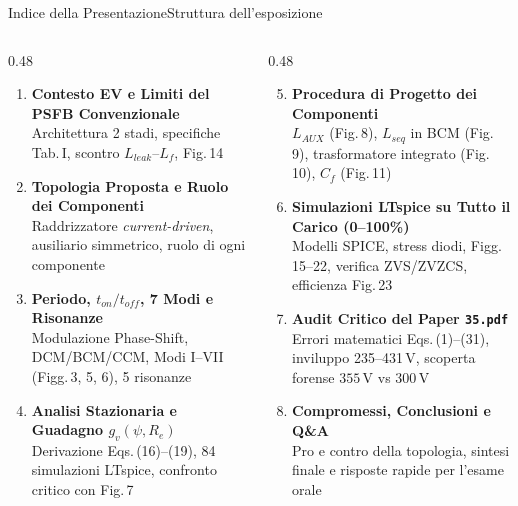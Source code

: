 \documentclass[aspectratio=169,9pt]{beamer}
\newcommand{\V}{\,\text{V}}
\begin{document}
\begin{frame}{Indice della Presentazione}{Struttura dell'esposizione}
  \begin{columns}[T,onlytextwidth]
    \begin{column}{0.48\textwidth}
      \small
      \begin{enumerate}
        \setlength{\itemsep}{6pt}
        \item \textbf{\color{PrimaryBlue}Contesto EV e Limiti del PSFB Convenzionale}\\
              {\scriptsize Architettura 2 stadi, specifiche Tab.\,I, scontro $L_{leak}$--$L_f$, Fig.\,14}
        \item \textbf{\color{PrimaryBlue}Topologia Proposta e Ruolo dei Componenti}\\
              {\scriptsize Raddrizzatore \emph{current-driven}, ausiliario simmetrico, ruolo di ogni componente}
        \item \textbf{\color{PrimaryBlue}Periodo, $t_{on}/t_{off}$, 7 Modi e Risonanze}\\
              {\scriptsize Modulazione Phase-Shift, DCM/BCM/CCM, Modi I--VII (Figg.\,3, 5, 6), 5 risonanze}
        \item \textbf{\color{PrimaryBlue}Analisi Stazionaria e Guadagno $g_v(\psi, R_e)$}\\
              {\scriptsize Derivazione Eqs.\,(16)--(19), 84 simulazioni LTspice, confronto critico con Fig.\,7}
      \end{enumerate}
    \end{column}
    \begin{column}{0.48\textwidth}
      \small
      \begin{enumerate}
        \setcounter{enumi}{4}
        \setlength{\itemsep}{6pt}
        \item \textbf{\color{PrimaryBlue}Procedura di Progetto dei Componenti}\\
              {\scriptsize $L_{AUX}$ (Fig.\,8), $L_{seq}$ in BCM (Fig.\,9), trasformatore integrato (Fig.\,10), $C_f$ (Fig.\,11)}
        \item \textbf{\color{PrimaryBlue}Simulazioni LTspice su Tutto il Carico (0--100\%)}\\
              {\scriptsize Modelli SPICE, stress diodi, Figg.\,15--22, verifica ZVS/ZVZCS, efficienza Fig.\,23}
        \item \textbf{\color{PrimaryBlue}Audit Critico del Paper \texttt{35.pdf}}\\
              {\scriptsize Errori matematici Eqs.\,(1)--(31), inviluppo 235--431\,V, scoperta forense $355\V$ vs $300\V$}
        \item \textbf{\color{PrimaryBlue}Compromessi, Conclusioni e Q\&A}\\
              {\scriptsize Pro e contro della topologia, sintesi finale e risposte rapide per l'esame orale}
      \end{enumerate}
    \end{column}
  \end{columns}
\end{frame}
\end{document}
